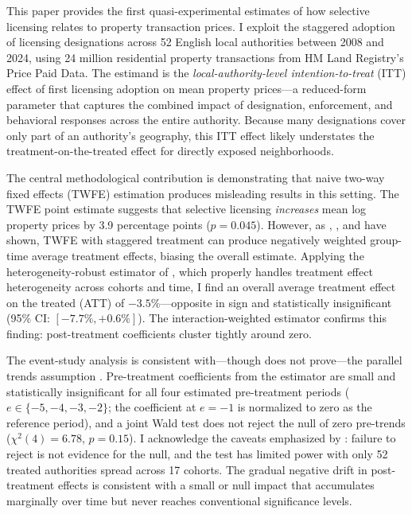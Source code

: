 \documentclass[12pt]{article}
\begin{document}
This paper provides the first quasi-experimental estimates of how selective licensing relates to property transaction prices. I exploit the staggered adoption of licensing designations across 52 English local authorities between 2008 and 2024, using 24 million residential property transactions from HM Land Registry's Price Paid Data. The estimand is the \emph{local-authority-level intention-to-treat} (ITT) effect of first licensing adoption on mean property prices---a reduced-form parameter that captures the combined impact of designation, enforcement, and behavioral responses across the entire authority. Because many designations cover only part of an authority's geography, this ITT effect likely understates the treatment-on-the-treated effect for directly exposed neighborhoods.

The central methodological contribution is demonstrating that naive two-way fixed effects (TWFE) estimation produces misleading results in this setting. The TWFE point estimate suggests that selective licensing \emph{increases} mean log property prices by 3.9 percentage points ($p = 0.045$). However, as \citet{goodman2021difference}, \citet{de2020two}, and \citet{sun2021estimating} have shown, TWFE with staggered treatment can produce negatively weighted group-time average treatment effects, biasing the overall estimate. Applying the heterogeneity-robust estimator of \citet{callaway2021difference}, which properly handles treatment effect heterogeneity across cohorts and time, I find an overall average treatment effect on the treated (ATT) of $-3.5\%$---opposite in sign and statistically insignificant (95\% CI: $[-7.7\%, +0.6\%]$). The \citet{sun2021estimating} interaction-weighted estimator confirms this finding: post-treatment coefficients cluster tightly around zero.

The event-study analysis is consistent with---though does not prove---the parallel trends assumption \citep{roth2022pretest}. Pre-treatment coefficients from the \citet{callaway2021difference} estimator are small and statistically insignificant for all four estimated pre-treatment periods ($e \in \{-5, -4, -3, -2\}$; the coefficient at $e = -1$ is normalized to zero as the reference period), and a joint Wald test does not reject the null of zero pre-trends ($\chi^2(4) = 6.78$, $p = 0.15$). I acknowledge the caveats emphasized by \citet{roth2022pretest}: failure to reject is not evidence for the null, and the test has limited power with only 52 treated authorities spread across 17 cohorts. The gradual negative drift in post-treatment effects is consistent with a small or null impact that accumulates marginally over time but never reaches conventional significance levels.
\end{document}
